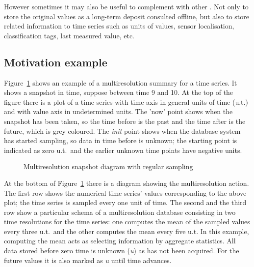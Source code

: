 However sometimes it may also be useful to complement 
with other . Not only to store the original values as a
long-term deposit consulted offline, but also to store related
information to time series such as units of values, sensor
localisation, classification tags, last measured value, etc.



\subsection{Motivation example}

Figure~\ref{fig:mtsms:sequence} shows an example of a multiresolution
summary for a time series. It shows a snapshot in time, suppose
between time 9 and 10. At the top of the figure there is a plot of a
time series with time axis in general units of time (u.t.) and with
value axis in undetermined units. The 'now' point shows when the
snapshot has been taken, so the time before is the past and the time
after is the future, which is grey coloured. The \emph{init} point
shows when the database system has started sampling, so data in time
before is unknown; the starting point is indicated as zero u.t.\ and
the earlier unknown time points have negative units.


\begin{figure}
  \centering
  
  \caption{Multiresolution snapshot diagram with regular sampling}
  \label{fig:mtsms:sequence}
\end{figure}


%   



At the bottom of Figure~\ref{fig:mtsms:sequence} there is a diagram
showing the multiresolution action. The first row shows the numerical
time series' values corresponding to the above plot; the time series
is sampled every one unit of time. The second and the third row show a
particular schema of a multiresolution database consisting in two time
resolutions for the time series: one computes the mean of the sampled
values every three u.t.\ and the other computes the mean every five
u.t. In this example, computing the mean acts as selecting information
by aggregate statistics. All data stored before zero time is unknown
(\emph{u}) as has not been acquired. For the future values it is also
marked as \emph{u} until time advances.

